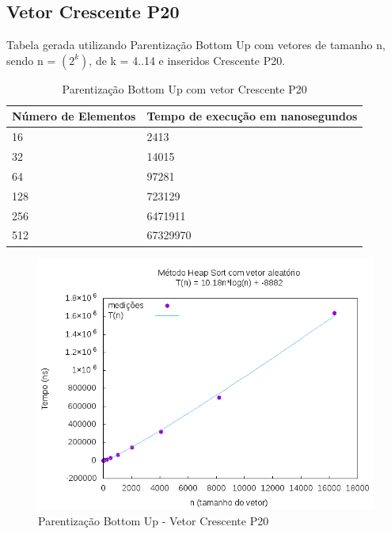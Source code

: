 \documentclass[12pt,a4paper,twoside]{report}
\begin{document}
\subsection{Vetor Crescente P20}
Tabela gerada utilizando Parentização Bottom Up com vetores de tamanho n, sendo n = $(2^k)$, de k = 4..14 e inseridos Crescente P20.
\begin{table}[H]
\centering
\caption{Parentização Bottom Up com vetor Crescente P20}
\label{my-label}
\begin{tabular}{|l|l|}
\hline
\multicolumn{1}{|c|}{\textbf{Número de Elementos}} & \multicolumn{1}{c|}{\textbf{Tempo de execução em nanosegundos}} \\ \hline
16 & 2413 \\ \hline
32 & 14015 \\ \hline
64 & 97281 \\ \hline
128 & 723129 \\ \hline
256 & 6471911 \\ \hline
512 & 67329970 \\ \hline
\end{tabular}
\end{table}

\begin{figure}[H]
    \centering
    \includegraphics[width=0.7\linewidth]{graficos/HeapSort/vIntAleatorio/vIntAleatorio.png}
  \caption{Parentização Bottom Up - Vetor Crescente P20}
\end{figure}
\end{document}
